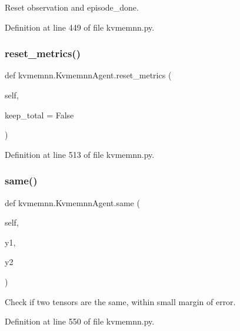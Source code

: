 \begin{DoxyVerb}Reset observation and episode_done.\end{DoxyVerb}
 

Definition at line 449 of file kvmemnn.\+py.

\mbox{\label{classkvmemnn_1_1KvmemnnAgent_a8d5a1f2f7e78582e5a75c85cbddfef39}} 
\subsubsection{\texorpdfstring{reset\+\_\+metrics()}{reset\_metrics()}}
{\footnotesize\ttfamily def kvmemnn.\+Kvmemnn\+Agent.\+reset\+\_\+metrics (\begin{DoxyParamCaption}\item[{}]{self,  }\item[{}]{keep\+\_\+total = {\ttfamily False} }\end{DoxyParamCaption})}



Definition at line 513 of file kvmemnn.\+py.

\mbox{\label{classkvmemnn_1_1KvmemnnAgent_a59c6078593c61e0adeda8487def4706e}} 
\subsubsection{\texorpdfstring{same()}{same()}}
{\footnotesize\ttfamily def kvmemnn.\+Kvmemnn\+Agent.\+same (\begin{DoxyParamCaption}\item[{}]{self,  }\item[{}]{y1,  }\item[{}]{y2 }\end{DoxyParamCaption})}

\begin{DoxyVerb}Check if two tensors are the same, within small margin of error.\end{DoxyVerb}
 

Definition at line 550 of file kvmemnn.\+py.



